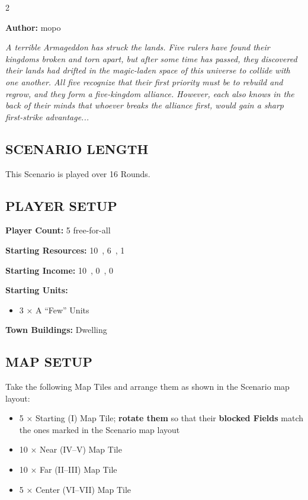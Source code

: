 
\begin{multicols}{2}

\textbf{Author:} mopo

\textit{A terrible Armageddon has struck the lands. Five rulers have found their kingdoms broken and torn apart, but after some time has passed, they discovered their lands had drifted in the magic-laden space of this universe to collide with one another. All five recognize that their first priority must be to rebuild and regrow, and they form a five-kingdom alliance. However, each also knows in the back of their minds that whoever breaks the alliance first, would gain a sharp first-strike advantage...}

\subsection*{\MakeUppercase{Scenario Length}}
This Scenario is played over 16 Rounds.

\subsection*{\MakeUppercase{Player Setup}}
\textbf{Player Count:} 5 free-for-all

\textbf{Starting Resources:} 10~, 6~, 1~

\textbf{Starting Income:} 10~, 0~, 0~

\textbf{Starting Units:}
\begin{itemize}
  \item 3 × A ``Few''  Units
\end{itemize}

\textbf{Town Buildings:}  Dwelling

\subsection*{\MakeUppercase{Map Setup}}
Take the following Map Tiles and arrange them as shown in the Scenario map layout:

\begin{itemize}
  \item 5 × Starting (I) Map Tile; \textbf{rotate them} so that their \textbf{blocked Fields} match the ones marked in the Scenario map layout
  \item 10 × Near (IV--V) Map Tile
  \item 10 × Far (II--III) Map Tile
  \item 5 × Center (VI--VII) Map Tile
\end{itemize}


\end{multicols}
